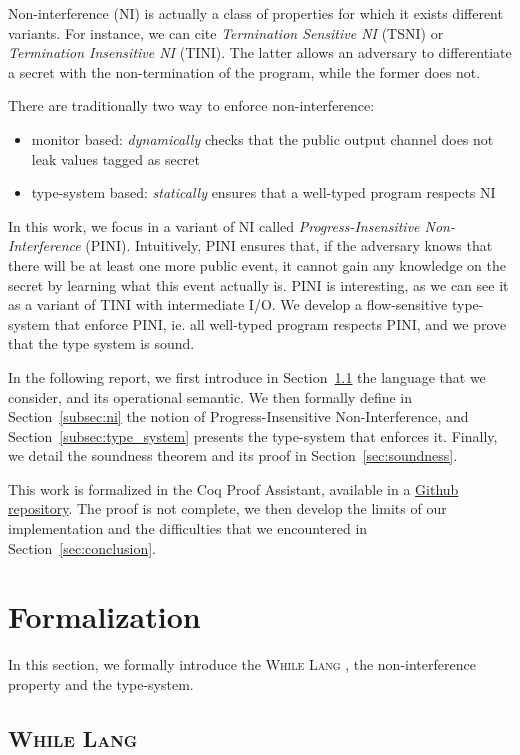 \documentclass[10pt]{article}
\newcommand{\whilelang}{\textsc{While Lang} }
\begin{document}
Non-interference (NI) is actually a class of properties for which it exists different variants. For
instance, we can cite \emph{Termination Sensitive NI} (TSNI) or \emph{Termination Insensitive NI}
(TINI). The latter allows an adversary to differentiate a secret with the non-termination of the
program, while the former does not.

There are traditionally two way to enforce non-interference:
\begin{itemize}
  \item monitor based: \emph{dynamically} checks that the public output channel does not leak values
        tagged as secret
  \item type-system based: \emph{statically} ensures that a well-typed program respects NI
\end{itemize}

In this work, we focus in a variant of NI called \emph{Progress-Insensitive Non-Interference}
(PINI).
Intuitively, PINI ensures that, if the adversary knows that there will be at least one more public
event, it cannot gain any knowledge on the secret by learning what this event actually is. PINI is
interesting, as we can see it as a variant of TINI with intermediate I/O.
We develop a flow-sensitive type-system that enforce PINI, ie. all well-typed program respects PINI,
and we prove that the type system is sound.

In the following report, we first introduce in
Section~\ref{subsec:opsem} the language that we consider, and its operational semantic.
We then formally define in Section~\ref{subsec:ni} the notion of Progress-Insensitive
Non-Interference, and Section~\ref{subsec:type_system} presents the type-system that enforces it.
Finally, we detail the soundness theorem and its proof in Section~\ref{sec:soundness}.

This work is formalized in the Coq Proof Assistant, available in a
\href{https://github.com/BastienRousseau/flow-sensitive-PINI}{Github repository}.
The proof is not complete, we then develop the limits of our implementation and the difficulties
that we encountered in Section~\ref{sec:conclusion}.

\section{Formalization}
\label{sec:formalization}
In this section, we formally introduce the \whilelang, the non-interference property and the
type-system.

\subsection{\whilelang}%
\label{subsec:opsem}
\end{document}
